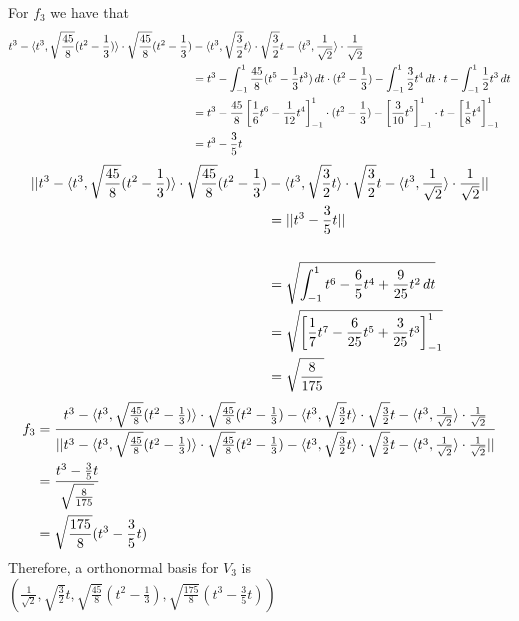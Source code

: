 For $f_3$ we have that
\begin{align*}
    t^3 - \langle t^3, \sqrt{\frac{45}{8}}(t^2 - \frac{1}{3}) \rangle \cdot \sqrt{\frac{45}{8}}(t^2 - \frac{1}{3}) &- \langle t^3, \sqrt{\frac{3}{2}}t \rangle \cdot \sqrt{\frac{3}{2}}t -\langle t^3, \frac{1}{\sqrt{2}} \rangle \cdot \frac{1}{\sqrt{2}}
    \\&= t^3 - \int_{-1}^{1} \frac{45}{8}(t^5 - \frac{1}{3}t^3) \,dt \cdot (t^2 - \frac{1}{3}) - \int_{-1}^{1} \frac{3}{2}t^4 \,dt \cdot t - \int_{-1}^{1} \frac{1}{2}t^3 \,dt
    \\&= t^3 - \frac{45}{8}\left[ \frac{1}{6}t^6 - \frac{1}{12}t^4 \right]_{-1}^{1} \cdot (t^2 - \frac{1}{3}) - \left[ \frac{3}{10}t^5 \right]_{-1}^{1} \cdot t - \left[ \frac{1}{8}t^4 \right]_{-1}^{1}
    \\&= t^3 -\frac{3}{5}t
\end{align*}
\begin{align*}
    ||t^3 - \langle t^3, \sqrt{\frac{45}{8}}(t^2 - \frac{1}{3}) \rangle \cdot \sqrt{\frac{45}{8}}(t^2 - \frac{1}{3}) &- \langle t^3, \sqrt{\frac{3}{2}}t \rangle \cdot \sqrt{\frac{3}{2}}t -\langle t^3, \frac{1}{\sqrt{2}} \rangle \cdot \frac{1}{\sqrt{2}}||
    \\&= ||t^3 -\frac{3}{5}t||\\
    \\&= \sqrt{\int_{-1}^{1} t^6-\frac{6}{5}t^4+\frac{9}{25}t^2 \,dt}
    \\&= \sqrt{\left[ \frac{1}{7}t^7 - \frac{6}{25}t^5 + \frac{3}{25}t^3 \right]_{-1}^{1}}
    \\&= \sqrt{\frac{8}{175}}
\end{align*}    
\begin{align*}
    f_3
    &= \frac{t^3 - \langle t^3, \sqrt{\frac{45}{8}}(t^2 - \frac{1}{3}) \rangle \cdot \sqrt{\frac{45}{8}}(t^2 - \frac{1}{3}) - \langle t^3, \sqrt{\frac{3}{2}}t \rangle \cdot \sqrt{\frac{3}{2}}t -\langle t^3, \frac{1}{\sqrt{2}} \rangle \cdot \frac{1}{\sqrt{2}}}{||t^3 - \langle t^3, \sqrt{\frac{45}{8}}(t^2 - \frac{1}{3}) \rangle \cdot \sqrt{\frac{45}{8}}(t^2 - \frac{1}{3}) - \langle t^3, \sqrt{\frac{3}{2}}t \rangle \cdot \sqrt{\frac{3}{2}}t -\langle t^3, \frac{1}{\sqrt{2}} \rangle \cdot \frac{1}{\sqrt{2}}||}\\
    &= \frac{t^3-\frac{3}{5}t}{\sqrt{\frac{8}{175}}}\\
    &= \sqrt{\frac{175}{8}}(t^3-\frac{3}{5}t)
\end{align*}
Therefore, a orthonormal basis for $V_3$ is 
$(\frac{1}{\sqrt{2}}, \sqrt{\frac{3}{2}}t, \sqrt{\frac{45}{8}}(t^2 - \frac{1}{3}), \sqrt{\frac{175}{8}}(t^3-\frac{3}{5}t))$
